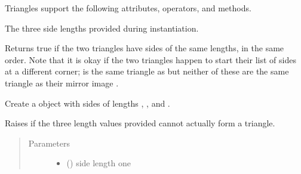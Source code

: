 \documentclass[letterpaper,10pt,english]{sphinxmanual}
\begin{document}
\begin{fulllineitems}
Triangles support the following attributes, operators, and methods.

\begin{fulllineitems}
\label{\detokenize{api:trianglelib.shape.Triangle.a}}\label{\detokenize{api:trianglelib.shape.Triangle.b}}\label{\detokenize{api:trianglelib.shape.Triangle.c}}
The three side lengths provided during instantiation.

\end{fulllineitems}


\ignorespaces 

\begin{fulllineitems}
Returns true if the two triangles have sides of the same lengths,
in the same order.
Note that it is okay if the two triangles
happen to start their list of sides at a different corner;
 is the same triangle as 
but neither of these are the same triangle
as their mirror image .

\end{fulllineitems}


\begin{fulllineitems}
\label{\detokenize{api:trianglelib.shape.Triangle.__init__}}
Create a {\hyperref[\detokenize{api:trianglelib.shape.Triangle}]{}} object with sides of lengths , , and .

Raises  if the three length values provided cannot
actually form a triangle.
\begin{quote}\begin{description}
\item[{Parameters}] \leavevmode\begin{itemize}
\item {} 
 () \textendash{} side length one


\end{itemize}
\end{description}
\end{quote}
\end{fulllineitems}
\end{fulllineitems}
\end{document}
